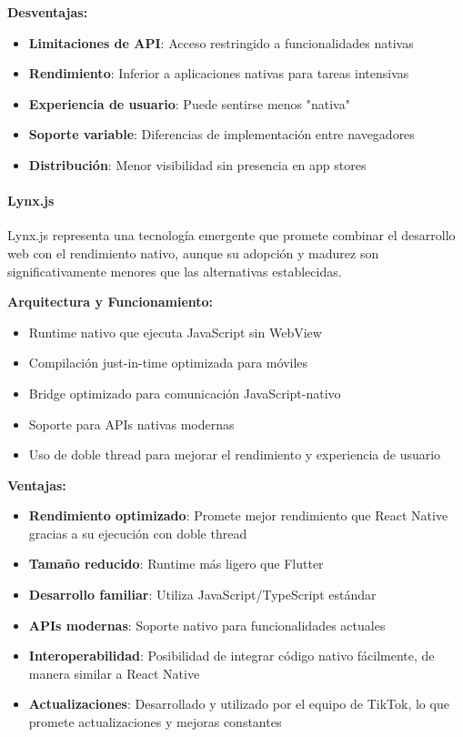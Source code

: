 \textbf{Desventajas:}
\begin{itemize}
    \item \textbf{Limitaciones de API}: Acceso restringido a funcionalidades nativas
    \item \textbf{Rendimiento}: Inferior a aplicaciones nativas para tareas intensivas
    \item \textbf{Experiencia de usuario}: Puede sentirse menos "nativa"
    \item \textbf{Soporte variable}: Diferencias de implementación entre navegadores
    \item \textbf{Distribución}: Menor visibilidad sin presencia en app stores
\end{itemize}

\paragraph{Lynx.js}

Lynx.js representa una tecnología emergente que promete combinar el desarrollo web con el rendimiento nativo, aunque su adopción y madurez son significativamente menores que las alternativas establecidas.

\textbf{Arquitectura y Funcionamiento:}
\begin{itemize}
    \item Runtime nativo que ejecuta JavaScript sin WebView
    \item Compilación just-in-time optimizada para móviles
    \item Bridge optimizado para comunicación JavaScript-nativo
    \item Soporte para APIs nativas modernas
    \item Uso de doble thread para mejorar el rendimiento y experiencia de usuario
\end{itemize}

\textbf{Ventajas:}
\begin{itemize}
    \item \textbf{Rendimiento optimizado}: Promete mejor rendimiento que React Native gracias a su ejecución con doble thread
    \item \textbf{Tamaño reducido}: Runtime más ligero que Flutter
    \item \textbf{Desarrollo familiar}: Utiliza JavaScript/TypeScript estándar
    \item \textbf{APIs modernas}: Soporte nativo para funcionalidades actuales
    \item \textbf{Interoperabilidad}: Posibilidad de integrar código nativo fácilmente, de manera similar a React Native
    \item \textbf{Actualizaciones}: Desarrollado y utilizado por el equipo de TikTok, lo que promete actualizaciones y mejoras constantes
\end{itemize}

